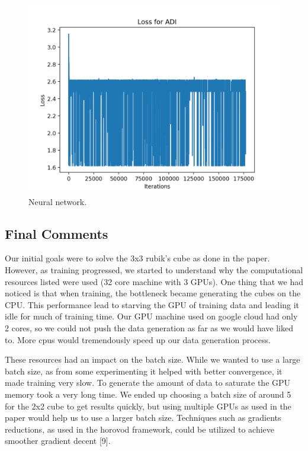 \documentclass[10pt,twocolumn,letterpaper]{article}
\begin{document}
\begin{figure}
  \includegraphics[width=\linewidth]{loss.png}
  \caption{Neural network.}
  \label{fig:net}
\end{figure}

\subsection{Final Comments}

Our initial goals were to solve the 3x3 rubik's cube as done in the paper. However, as training progressed, we started to understand why the computational resources listed were used (32 core machine with 3 GPUs). One thing that we had noticed is that when training, the bottleneck became generating the cubes on the CPU. This performance lead to starving the GPU of training data and leading it idle for much of training time. Our GPU machine used on google cloud had only 2 cores, so we could not push the data generation as far as we would have liked to. More cpus would tremendously speed up our data generation process.

These resources had an impact on the batch size. While we wanted to use a large batch size, as from some experimenting it helped with better convergence, it made training very slow. To generate the amount of data to saturate the GPU memory took a very long time. We ended up choosing a batch size of around 5 for the 2x2 cube to get results quickly, but using multiple GPUs as used in the paper would help us to use a larger batch size. Techniques such as gradients reductions, as used in the horovod framework, could be utilized to achieve smoother gradient decent [9].
\end{document}

